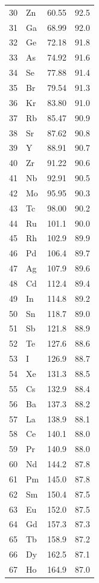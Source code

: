 \documentclass[11pt,a4paper]{article}
\begin{document}
\begin{longtable}{c l c c}
		30 & Zn  & 60.55  & 92.5 \\
		31 & Ga  & 68.99  & 92.0 \\
		32 & Ge  & 72.18  & 91.8 \\
		33 & As  & 74.92  & 91.6 \\
		34 & Se  & 77.88  & 91.4 \\
		35 & Br  & 79.54  & 91.3 \\
		36 & Kr  & 83.80  & 91.0 \\
		37 & Rb  & 85.47  & 90.9 \\
		38 & Sr  & 87.62  & 90.8 \\
		39 & Y   & 88.91  & 90.7 \\
		40 & Zr  & 91.22  & 90.6 \\
		41 & Nb  & 92.91  & 90.5 \\
		42 & Mo  & 95.95  & 90.3 \\
		43 & Tc  & 98.00  & 90.2 \\
		44 & Ru  & 101.1  & 90.0 \\
		45 & Rh  & 102.9  & 89.9 \\
		46 & Pd  & 106.4  & 89.7 \\
		47 & Ag  & 107.9  & 89.6 \\
		48 & Cd  & 112.4  & 89.4 \\
		49 & In  & 114.8  & 89.2 \\
		50 & Sn  & 118.7  & 89.0 \\
		51 & Sb  & 121.8  & 88.9 \\
		52 & Te  & 127.6  & 88.6 \\
		53 & I   & 126.9  & 88.7 \\
		54 & Xe  & 131.3  & 88.5 \\
		55 & Cs  & 132.9  & 88.4 \\
		56 & Ba  & 137.3  & 88.2 \\
		57 & La  & 138.9  & 88.1 \\
		58 & Ce  & 140.1  & 88.0 \\
		59 & Pr  & 140.9  & 88.0 \\
		60 & Nd  & 144.2  & 87.8 \\
		61 & Pm  & 145.0  & 87.8 \\
		62 & Sm  & 150.4  & 87.5 \\
		63 & Eu  & 152.0  & 87.5 \\
		64 & Gd  & 157.3  & 87.3 \\
		65 & Tb  & 158.9  & 87.2 \\
		66 & Dy  & 162.5  & 87.1 \\
		67 & Ho  & 164.9  & 87.0 \\

\end{longtable}
\end{document}
